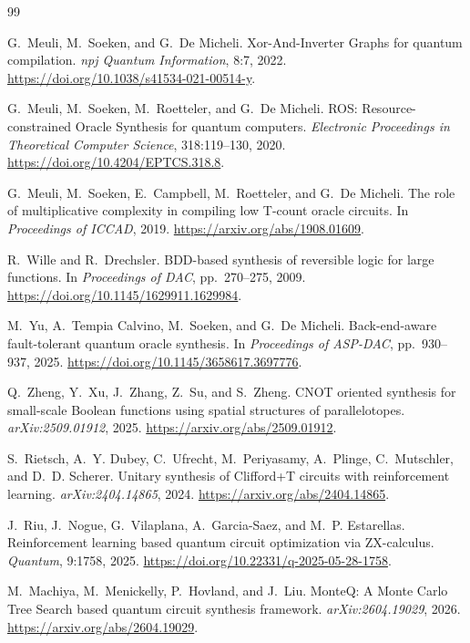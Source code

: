 \documentclass[UTF8,fontset=macnew,11pt]{ctexart}
\begin{document}
\begin{thebibliography}{99}

G.~Meuli, M.~Soeken, and G.~De Micheli.
\newblock Xor-And-Inverter Graphs for quantum compilation.
\newblock \emph{npj Quantum Information}, 8:7, 2022.
\newblock \url{https://doi.org/10.1038/s41534-021-00514-y}.

G.~Meuli, M.~Soeken, M.~Roetteler, and G.~De Micheli.
\newblock ROS: Resource-constrained Oracle Synthesis for quantum computers.
\newblock \emph{Electronic Proceedings in Theoretical Computer Science}, 318:119--130, 2020.
\newblock \url{https://doi.org/10.4204/EPTCS.318.8}.

G.~Meuli, M.~Soeken, E.~Campbell, M.~Roetteler, and G.~De Micheli.
\newblock The role of multiplicative complexity in compiling low T-count oracle circuits.
\newblock In \emph{Proceedings of ICCAD}, 2019.
\newblock \url{https://arxiv.org/abs/1908.01609}.

R.~Wille and R.~Drechsler.
\newblock BDD-based synthesis of reversible logic for large functions.
\newblock In \emph{Proceedings of DAC}, pp.~270--275, 2009.
\newblock \url{https://doi.org/10.1145/1629911.1629984}.

M.~Yu, A.~Tempia Calvino, M.~Soeken, and G.~De Micheli.
\newblock Back-end-aware fault-tolerant quantum oracle synthesis.
\newblock In \emph{Proceedings of ASP-DAC}, pp.~930--937, 2025.
\newblock \url{https://doi.org/10.1145/3658617.3697776}.

Q.~Zheng, Y.~Xu, J.~Zhang, Z.~Su, and S.~Zheng.
\newblock CNOT oriented synthesis for small-scale Boolean functions using spatial structures of parallelotopes.
\newblock \emph{arXiv:2509.01912}, 2025.
\newblock \url{https://arxiv.org/abs/2509.01912}.

S.~Rietsch, A.~Y. Dubey, C.~Ufrecht, M.~Periyasamy, A.~Plinge, C.~Mutschler, and D.~D. Scherer.
\newblock Unitary synthesis of Clifford+T circuits with reinforcement learning.
\newblock \emph{arXiv:2404.14865}, 2024.
\newblock \url{https://arxiv.org/abs/2404.14865}.

J.~Riu, J.~Nogue, G.~Vilaplana, A.~Garcia-Saez, and M.~P. Estarellas.
\newblock Reinforcement learning based quantum circuit optimization via ZX-calculus.
\newblock \emph{Quantum}, 9:1758, 2025.
\newblock \url{https://doi.org/10.22331/q-2025-05-28-1758}.

M.~Machiya, M.~Menickelly, P.~Hovland, and J.~Liu.
\newblock MonteQ: A Monte Carlo Tree Search based quantum circuit synthesis framework.
\newblock \emph{arXiv:2604.19029}, 2026.
\newblock \url{https://arxiv.org/abs/2604.19029}.

\end{thebibliography}
\end{document}
